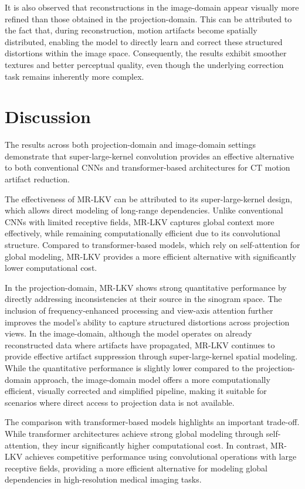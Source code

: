 It is also observed that reconstructions in the image-domain appear visually more refined than those obtained in the projection-domain. This can be attributed to the fact that, during reconstruction, motion artifacts become spatially distributed, enabling the model to directly learn and correct these structured distortions within the image space. Consequently, the results exhibit smoother textures and better perceptual quality, even though the underlying correction task remains inherently more complex.




\section{Discussion}

The results across both projection-domain and image-domain settings demonstrate that super-large-kernel convolution provides an effective alternative to both conventional CNNs and transformer-based architectures for CT motion artifact reduction. 

The effectiveness of MR-LKV can be attributed to its super-large-kernel design, which allows direct modeling of long-range dependencies. Unlike conventional CNNs with limited receptive fields, MR-LKV captures global context more effectively, while remaining computationally efficient due to its convolutional structure. Compared to transformer-based models, which rely on self-attention for global modeling, MR-LKV provides a more efficient alternative with significantly lower computational cost.

In the projection-domain, MR-LKV shows strong  quantitative performance by directly addressing inconsistencies at their source in the sinogram space. The inclusion of frequency-enhanced processing and view-axis attention further improves the model’s ability to capture structured distortions across projection views. 
In the image-domain, although the model operates on already reconstructed data where artifacts have propagated, MR-LKV continues to provide effective artifact suppression through super-large-kernel spatial modeling. While the quantitative performance is slightly lower compared to the projection-domain approach, the image-domain model offers a more computationally efficient, visually corrected and simplified pipeline, making it suitable for scenarios where direct access to projection data is not available.

The comparison with transformer-based models highlights an important trade-off. While transformer architectures achieve strong global modeling through self-attention, they incur significantly higher computational cost. In contrast, MR-LKV achieves competitive performance using convolutional operations with large receptive fields, providing a more efficient alternative for modeling global dependencies in high-resolution medical imaging tasks.


